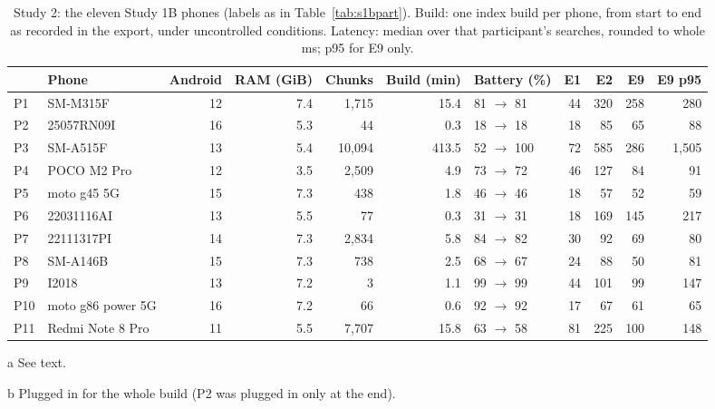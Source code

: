 \documentclass[11pt,a4paper]{article}
\begin{document}
\begin{table}[tbp]
\centering\footnotesize\setlength{\tabcolsep}{3.5pt}
\begin{threeparttable}
\caption{Study 2: the eleven Study 1B phones (labels as in Table~\ref{tab:s1bpart}). Build: one index build per phone, from start to end as recorded in the export, under uncontrolled conditions. Latency: median over that participant's searches, rounded to whole ms; p95 for E9 only.}
\label{tab:s1bphones}
\begin{tabular}{llrrrrlrrrr}
\toprule
 & Phone & Android & RAM (GiB) & Chunks & Build (min) & Battery (\%) & E1 & E2 & E9 & E9 p95 \\
\midrule
P1 & SM-M315F & 12 & 7.4 & 1,715 & 15.4 & 81 $\to$ 81\tnote{b} & 44 & 320 & 258 & 280 \\
P2 & 25057RN09I & 16 & 5.3 & 44 & 0.3 & 18 $\to$ 18 & 18 & 85 & 65 & 88 \\
P3 & SM-A515F & 13 & 5.4 & 10,094 & 413.5\tnote{a} & 52 $\to$ 100\tnote{b} & 72 & 585 & 286 & 1,505 \\
P4 & POCO M2 Pro & 12 & 3.5 & 2,509 & 4.9 & 73 $\to$ 72 & 46 & 127 & 84 & 91 \\
P5 & moto g45 5G & 15 & 7.3 & 438 & 1.8 & 46 $\to$ 46 & 18 & 57 & 52 & 59 \\
P6 & 22031116AI & 13 & 5.5 & 77 & 0.3 & 31 $\to$ 31 & 18 & 169 & 145 & 217 \\
P7 & 22111317PI & 14 & 7.3 & 2,834 & 5.8 & 84 $\to$ 82 & 30 & 92 & 69 & 80 \\
P8 & SM-A146B & 15 & 7.3 & 738 & 2.5 & 68 $\to$ 67 & 24 & 88 & 50 & 81 \\
P9 & I2018 & 13 & 7.2 & 3 & 1.1 & 99 $\to$ 99 & 44 & 101 & 99 & 147 \\
P10 & moto g86 power 5G & 16 & 7.2 & 66 & 0.6 & 92 $\to$ 92\tnote{b} & 17 & 67 & 61 & 65 \\
P11 & Redmi Note 8 Pro & 11 & 5.5 & 7,707 & 15.8 & 63 $\to$ 58 & 81 & 225 & 100 & 148 \\
\bottomrule
\end{tabular}
\begin{tablenotes}\footnotesize
\item[a] See text.
\item[b] Plugged in for the whole build (P2 was plugged in only at the end).
\end{tablenotes}
\end{threeparttable}
\end{table}
\end{document}
